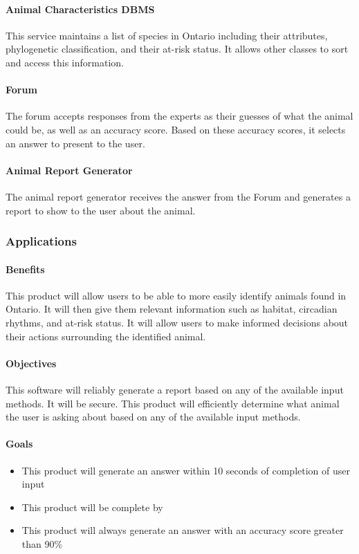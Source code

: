 \documentclass[]{article}
\begin{document}
\paragraph{Animal Characteristics DBMS}
This service maintains a list of species in Ontario including their attributes, phylogenetic classification, and their at-risk status. It allows other classes to sort and access this information.
\paragraph{Forum}
The forum accepts responses from the experts as their guesses of what the animal could be, as well as an accuracy score. Based on these accuracy scores, it selects an answer to present to the user.
\paragraph{Animal Report Generator}
The animal report generator receives the answer from the Forum and generates a report to show to the user about the animal.
\subsubsection{Applications}
\paragraph{Benefits}
This product will allow users to be able to more easily identify animals found in Ontario. It will then give them relevant information such as habitat, circadian rhythms, and at-risk status.
It will allow users to make informed decisions about their actions surrounding the identified animal.
\paragraph{Objectives}
This software will reliably generate a report based on any of the available input methods. It will be secure. This product will efficiently determine what animal the user is asking about based on any of the available input methods.
\paragraph{Goals}
\begin{itemize}
	\item This product will generate an answer within 10 seconds of completion of user input
	\item This product will be complete by
	\item This product will always generate an answer with an accuracy score greater than 90\%
\end{itemize}
\end{document}
